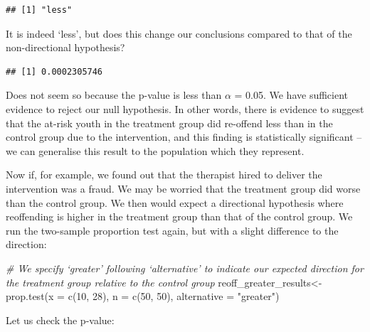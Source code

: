 \documentclass[
]{book}
\newenvironment{Shaded}{\begin{snugshade}}{\end{snugshade}}
\newcommand{\AttributeTok}[1]{\textcolor[rgb]{0.77,0.63,0.00}{#1}}
\newcommand{\CommentTok}[1]{\textcolor[rgb]{0.56,0.35,0.01}{\textit{#1}}}
\newcommand{\DecValTok}[1]{\textcolor[rgb]{0.00,0.00,0.81}{#1}}
\newcommand{\FunctionTok}[1]{\textcolor[rgb]{0.00,0.00,0.00}{#1}}
\newcommand{\NormalTok}[1]{#1}
\newcommand{\OtherTok}[1]{\textcolor[rgb]{0.56,0.35,0.01}{#1}}
\newcommand{\SpecialCharTok}[1]{\textcolor[rgb]{0.00,0.00,0.00}{#1}}
\newcommand{\StringTok}[1]{\textcolor[rgb]{0.31,0.60,0.02}{#1}}
\begin{document}
\begin{verbatim}
## [1] "less"
\end{verbatim}

It is indeed `less', but does this change our conclusions compared to that of the non-directional hypothesis?

\begin{Shaded}
\end{Shaded}

\begin{verbatim}
## [1] 0.0002305746
\end{verbatim}

Does not seem so because the p-value is less than \(\alpha\) = 0.05. We have sufficient evidence to reject our null hypothesis. In other words, there is evidence to suggest that the at-risk youth in the treatment group did re-offend less than in the control group due to the intervention, and this finding is statistically significant -- we can generalise this result to the population which they represent.

Now if, for example, we found out that the therapist hired to deliver the intervention was a fraud. We may be worried that the treatment group did worse than the control group. We then would expect a directional hypothesis where reoffending is higher in the treatment group than that of the control group. We run the two-sample proportion test again, but with a slight difference to the direction:

\begin{Shaded}
\begin{Highlighting}[]
\CommentTok{\# We specify ‘greater’ following ‘alternative’ to indicate our expected direction for the treatment group relative to the control group}
\NormalTok{reoff\_greater\_results}\OtherTok{\textless{}{-}} \FunctionTok{prop.test}\NormalTok{(}\AttributeTok{x =} \FunctionTok{c}\NormalTok{(}\DecValTok{10}\NormalTok{, }\DecValTok{28}\NormalTok{), }\AttributeTok{n =} \FunctionTok{c}\NormalTok{(}\DecValTok{50}\NormalTok{, }\DecValTok{50}\NormalTok{), }\AttributeTok{alternative =} \StringTok{"greater"}\NormalTok{)}
\end{Highlighting}
\end{Shaded}

Let us check the p-value:

\begin{Shaded}
\end{Shaded}
\end{document}

